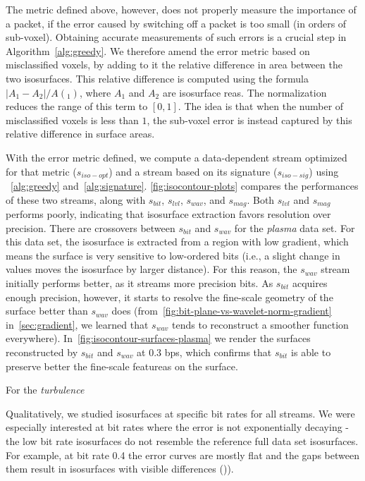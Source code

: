 The metric defined above, however, does not properly measure the importance of a packet, if the
error caused by switching off a packet is too small (in orders of sub-voxel). Obtaining accurate
measurements of such errors is a crucial step in Algorithm~\cref{alg:greedy}. We therefore amend the
error metric based on misclassified voxels, by adding to it the relative difference in area between
the two isosurfaces. This relative difference is computed using the formula $|A_1-A_2|/A(_1)$, where
$A_1$ and $A_2$ are isosurface reas. The normalization reduces the range of this term to $[0, 1]$.
The idea is that when the number of misclassified voxels is less than $1$, the sub-voxel error is
instead captured by this relative difference in surface areas.

With the error metric defined, we compute a data-dependent stream optimized for that metric
($s_{iso-opt}$) and a stream based on its signature ($s_{iso-sig}$) using ~\cref{alg:greedy}
and~\cref{alg:signature}. \cref{fig:isocontour-plots} compares the performances of these two
streams, along with $s_{bit}$, $s_{lvl}$, $s_{wav}$, and $s_{mag}$. Both $s_{lvl}$ and $s_{mag}$
performs poorly, indicating that isosurface extraction favors resolution over precision. There are
crossovers between $s_{bit}$ and $s_{wav}$ for the \emph{plasma} data set. For this data set, the
isosurface is extracted from a region with low gradient, which means the surface is very sensitive
to low-ordered bits (i.e., a slight change in values moves the isosurface by larger distance). For
this reason, the $s_{wav}$ stream initially performs better, as it streams more precision bits. As
$s_{bit}$ acquires enough precision, however, it starts to resolve the fine-scale geometry of the
surface better than $s_{wav}$ does (from~\cref{fig:bit-plane-vs-wavelet-norm-gradient}
in~\cref{sec:gradient}, we learned that $s_{wav}$ tends to reconstruct a smoother function
everywhere). In~\cref{fig:isocontour-surfaces-plasma} we render the surfaces reconstructed by
$s_{bit}$ and $s_{wav}$ at 0.3 bps, which confirms that $s_{bit}$ is able to preserve better the
fine-scale featureas on the surface.

For the \emph{turbulence}

Qualitatively, we studied isosurfaces at specific bit rates for all streams. We were especially
interested at bit rates where the error is not exponentially decaying - the low bit rate isosurfaces
do not resemble the reference full data set isosurfaces. For example, at bit rate 0.4 the error
curves are mostly flat and the gaps between them result in isosurfaces with visible differences
()).

